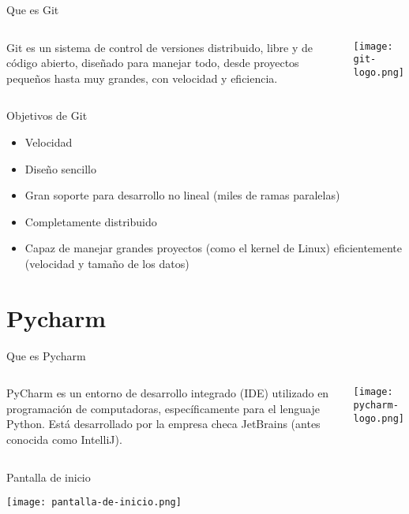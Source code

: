 \begin{frame}[c]{Que es Git}
    \begin{columns}
        Git es un sistema de control de versiones distribuido, libre y de
        código abierto, diseñado para manejar todo, desde proyectos pequeños
        hasta muy grandes, con velocidad y eficiencia. 
        \begin{center}
            \texttt{[image: git-logo.png]}
        \end{center}
    \end{columns}
\end{frame}

\begin{frame}[c]{Objetivos de Git}
    \begin{itemize}
        \item Velocidad
        \item Diseño sencillo
        \item Gran soporte para desarrollo no lineal (miles de ramas paralelas)
        \item Completamente distribuido
        \item Capaz de manejar grandes proyectos (como el kernel de Linux)
            eficientemente (velocidad y tamaño de los datos)
    \end{itemize}
\end{frame}

\section{Pycharm}

\begin{frame}[c]{Que es Pycharm}
    \begin{columns}
        PyCharm es un entorno de desarrollo integrado (IDE) utilizado en
        programación de computadoras, específicamente para el lenguaje Python.
        Está desarrollado por la empresa checa JetBrains (antes conocida como
        IntelliJ).
        \begin{center}
            \texttt{[image: pycharm-logo.png]}
        \end{center}
    \end{columns}
\end{frame}

\begin{frame}[c]{Pantalla de inicio}
    \begin{center}
        \texttt{[image: pantalla-de-inicio.png]}
    \end{center}
\end{frame}

